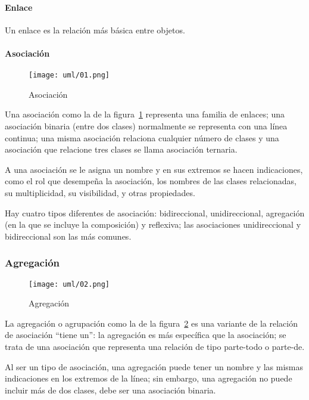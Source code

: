 \paragraph*{Enlace}
Un enlace es la relación más básica entre objetos.

\paragraph*{Asociación}



\begin{figure}[H] 
    \centering
    \texttt{[image: uml/01.png]}
    \caption{Asociación}
    \label{img:uml-asociacion}
\end{figure}

Una asociación como la de la figura~\ref{img:uml-asociacion} representa una familia de enlaces; una asociación binaria (entre dos clases) normalmente se representa con una línea continua; una misma asociación relaciona cualquier número de clases y una asociación que relacione tres clases se llama asociación ternaria.

A una asociación se le asigna un nombre y en sus extremos se hacen indicaciones, como el rol que desempeña la asociación, los nombres de las clases relacionadas, su multiplicidad, su visibilidad, y otras propiedades.

Hay cuatro tipos diferentes de asociación: bidireccional, unidireccional, agregación (en la que se incluye la composición) y reflexiva; las asociaciones unidireccional y bidireccional son las más comunes.


\subsubsection*{Agregación}


\begin{figure}[H] 
    \centering
    \texttt{[image: uml/02.png]}
    \caption{Agregación}
    \label{img:uml-agregacion}
\end{figure}


La agregación o agrupación como la de la figura~\ref{img:uml-agregacion} es una variante de la relación de asociación ``tiene un'': la agregación es más específica que la asociación; se trata de una asociación que representa una relación de tipo parte-todo o parte-de.


Al ser un tipo de asociación, una agregación puede tener un nombre y las mismas indicaciones en los extremos de la línea; sin embargo, una agregación no puede incluir más de dos clases, debe ser una asociación binaria.


